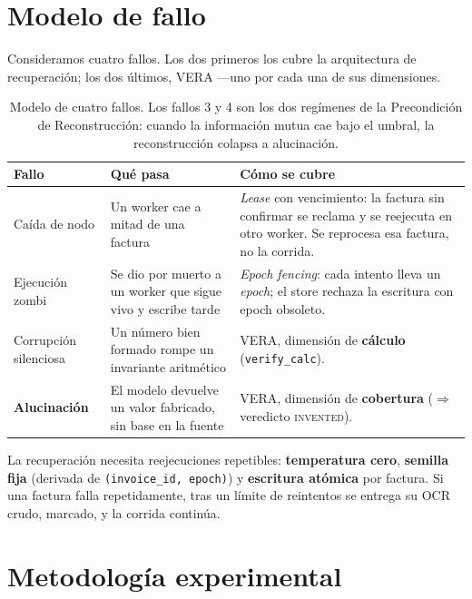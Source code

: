 \section{Modelo de fallo}

Consideramos cuatro fallos. Los dos primeros los cubre la arquitectura de recuperación; los
dos últimos, VERA ---uno por cada una de sus dimensiones.

\begin{table}[h]
\centering
\small
\begin{tabular}{@{}p{2.6cm} p{5.4cm} p{6.0cm}@{}}
\toprule
\textbf{Fallo} & \textbf{Qué pasa} & \textbf{Cómo se cubre} \\
\midrule
Caída de nodo & Un worker cae a mitad de una factura & \emph{Lease} con vencimiento: la
factura sin confirmar se reclama y se reejecuta en otro worker. Se reprocesa esa factura, no
la corrida. \\
Ejecución zombi & Se dio por muerto a un worker que sigue vivo y escribe tarde & \emph{Epoch
fencing}: cada intento lleva un \emph{epoch}; el store rechaza la escritura con epoch
obsoleto. \\
Corrupción silenciosa & Un número bien formado rompe un invariante aritmético & VERA,
dimensión de \textbf{cálculo} (\texttt{verify\_calc}). \\
\textbf{Alucinación} & El modelo devuelve un valor fabricado, sin base en la fuente & VERA,
dimensión de \textbf{cobertura} ($\Rightarrow$ veredicto \textsc{invented}). \\
\bottomrule
\end{tabular}
\caption{Modelo de cuatro fallos. Los fallos 3 y 4 son los dos regímenes de la Precondición
de Reconstrucción: cuando la información mutua cae bajo el umbral, la reconstrucción colapsa a
alucinación.}
\end{table}

La recuperación necesita reejecuciones repetibles: \textbf{temperatura cero}, \textbf{semilla
fija} (derivada de \texttt{(invoice\_id, epoch)}) y \textbf{escritura atómica} por factura. Si
una factura falla repetidamente, tras un límite de reintentos se entrega su OCR crudo,
marcado, y la corrida continúa.

\section{Metodología experimental}

